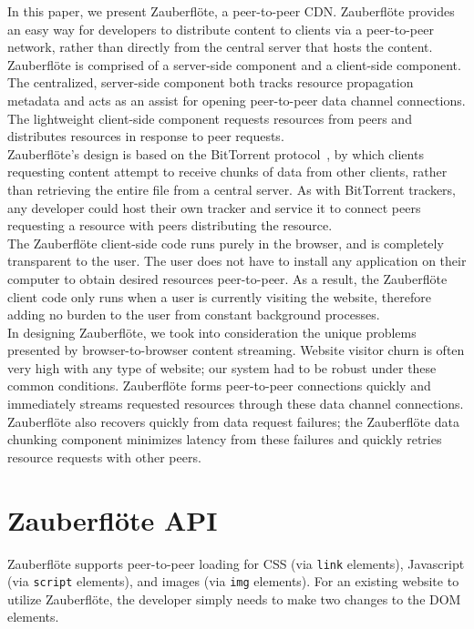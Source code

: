 \documentclass[letterpaper,twocolumn,10pt]{article}
\newcommand{\zbf}{Zauberfl\"{o}te\xspace}
\begin{document}
In this paper, we present \zbf, a peer-to-peer CDN. \zbf provides an easy way
for developers to distribute content to clients via a peer-to-peer network,
rather than directly from the central server that hosts the content. \zbf
is comprised of a server-side component and a client-side component. The
centralized, server-side component both tracks resource propagation metadata
and acts as an assist for opening peer-to-peer data channel connections. The
lightweight client-side component requests resources from peers and distributes
resources in response to peer requests. \\

\zbf's design is based on the BitTorrent protocol~\cite{cohen:bittorrent}, by which
clients requesting content attempt to receive chunks of data from other
clients, rather than retrieving the entire file from a central server. As
with BitTorrent trackers, any developer could host their own tracker and service
it to connect peers requesting a resource with peers distributing the resource. \\

The \zbf client-side code runs purely in the browser, and is completely transparent
to the user. The user does not have to install any application on their
computer to obtain desired resources peer-to-peer. As a result, the \zbf client
code only runs when a user is currently visiting the website, therefore adding
no burden to the user from constant background processes. \\

In designing \zbf, we took into consideration the unique problems presented
by browser-to-browser content streaming. Website visitor churn is often very
high with any type of website; our system had to be robust under these common
conditions. \zbf forms peer-to-peer connections quickly and immediately streams
requested resources through these data channel connections. \zbf also recovers
quickly from data request failures; the \zbf data chunking component minimizes
latency from these failures and quickly retries resource requests with other
peers.

\section{\zbf API}

\zbf supports peer-to-peer loading for CSS (via \texttt{link} elements),
Javascript (via \texttt{script} elements), and images (via \texttt{img} elements).
For an existing website to utilize \zbf, the developer simply needs
to make two changes to the DOM elements. \\
\end{document}
